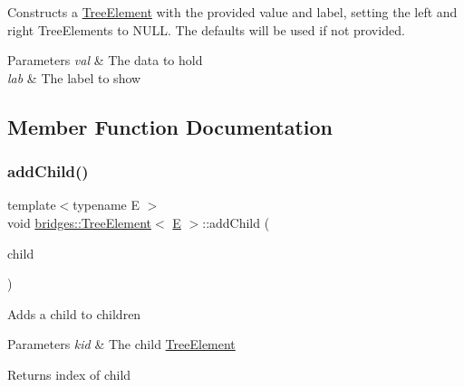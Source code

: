 Constructs a \mbox{\hyperlink{classbridges_1_1_tree_element}{Tree\+Element}} with the provided value and label, setting the left and right Tree\+Elements to N\+U\+LL. The defaults will be used if not provided.


\begin{DoxyParams}{Parameters}
{\em val} & The data to hold \\
\hline
{\em lab} & The label to show \\
\hline
\end{DoxyParams}


\subsection{Member Function Documentation}
\mbox{\label{classbridges_1_1_tree_element_a5e252fa16df0e673526ba4b08c8d3203}} 
\subsubsection{\texorpdfstring{addChild()}{addChild()}}
{\footnotesize\ttfamily template$<$typename E $>$ \\
void \mbox{\hyperlink{classbridges_1_1_tree_element}{bridges\+::\+Tree\+Element}}$<$ \mbox{\hyperlink{namespacebridges_acfb0a4f7877d8f63de3e6862004c50eda3a3ea00cfc35332cedf6e5e9a32e94da}{E}} $>$\+::add\+Child (\begin{DoxyParamCaption}\item[{\mbox{\hyperlink{classbridges_1_1_tree_element}{Tree\+Element}}$<$ \mbox{\hyperlink{namespacebridges_acfb0a4f7877d8f63de3e6862004c50eda3a3ea00cfc35332cedf6e5e9a32e94da}{E}} $>$ $\ast$}]{child }\end{DoxyParamCaption})\hspace{0.3cm}{\ttfamily [inline]}}

Adds a child to children


\begin{DoxyParams}{Parameters}
{\em kid} & The child \mbox{\hyperlink{classbridges_1_1_tree_element}{Tree\+Element}} \\
\hline
\end{DoxyParams}
\begin{DoxyReturn}{Returns}
index of child 
\end{DoxyReturn}
\mbox{\label{classbridges_1_1_tree_element_aad832c9f8dfd7e92c7b06a825f406e1d}} 
